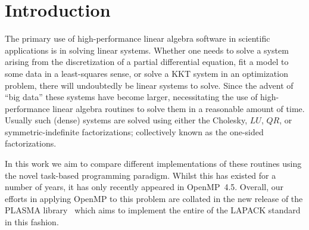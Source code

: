 \documentclass[a4paper,12pt]{article}
\begin{document}
%

\newpage

\renewcommand{\contentsname}{Table of Contents}
\tableofcontents

\listoffigures

\listoftables





\newpage

%

\section{Introduction}
\label{sec.introduction}
The primary use of high-performance linear algebra software
in scientific applications is in solving linear systems.
Whether one needs to solve a system arising from the discretization of
a partial differential equation,
fit a model to some data in a least-squares sense,
or solve a KKT system in an optimization problem,
there will undoubtedly be linear systems to solve.
Since the advent of ``big data'' these systems have become larger,
necessitating the use of high-performance linear algebra routines
to solve them in a reasonable amount of time.
Usually such (dense) systems are solved using either
the Cholesky, $LU$, $QR$, or symmetric-indefinite factorizations;
collectively known as the one-sided factorizations.

In this work we aim to compare different implementations of
these routines using the novel task-based programming paradigm.
Whilst this has existed for a number of years,
it has only recently appeared in OpenMP~4.5.
Overall,
our efforts in applying OpenMP to this problem
are collated in the new release of the PLASMA library~\cite{addh09}
which aims to implement the entire of the LAPACK standard~\cite{lug99}
in this fashion.
\end{document}

